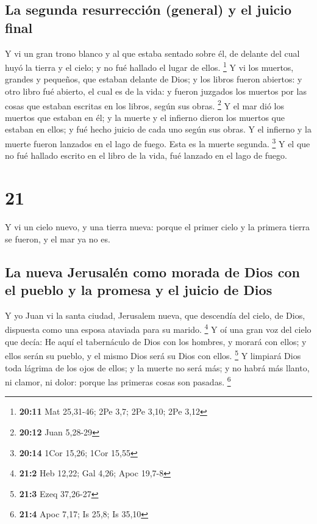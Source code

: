 \hypertarget{la-segunda-resurrecciuxf3n-general-y-el-juicio-final}{%
\subsection{La segunda resurrección (general) y el juicio
final}\label{la-segunda-resurrecciuxf3n-general-y-el-juicio-final}}

 Y vi un gran trono blanco y al que estaba sentado sobre
él, de delante del cual huyó la tierra y el cielo; y no fué hallado el
lugar de ellos. \footnote{\textbf{20:11} Mat 25,31-46; 2Pe 3,7; 2Pe
  3,10; 2Pe 3,12}  Y vi los muertos, grandes y pequeños,
que estaban delante de Dios; y los libros fueron abiertos: y otro libro
fué abierto, el cual es de la vida: y fueron juzgados los muertos por
las cosas que estaban escritas en los libros, según sus obras.
\footnote{\textbf{20:12} Juan 5,28-29}  Y el mar dió los
muertos que estaban en él; y la muerte y el infierno dieron los muertos
que estaban en ellos; y fué hecho juicio de cada uno según sus obras.
 Y el infierno y la muerte fueron lanzados en el lago de
fuego. Esta es la muerte segunda. \footnote{\textbf{20:14} 1Cor 15,26;
  1Cor 15,55}  Y el que no fué hallado escrito en el libro
de la vida, fué lanzado en el lago de fuego.

\hypertarget{section-20}{%
\section{21}\label{section-20}}

 Y vi un cielo nuevo, y una tierra nueva: porque el primer
cielo y la primera tierra se fueron, y el mar ya no es.

\hypertarget{la-nueva-jerusaluxe9n-como-morada-de-dios-con-el-pueblo-y-la-promesa-y-el-juicio-de-dios}{%
\subsection{La nueva Jerusalén como morada de Dios con el pueblo y la
promesa y el juicio de
Dios}\label{la-nueva-jerusaluxe9n-como-morada-de-dios-con-el-pueblo-y-la-promesa-y-el-juicio-de-dios}}

 Y yo Juan vi la santa ciudad, Jerusalem nueva, que
descendía del cielo, de Dios, dispuesta como una esposa ataviada para su
marido. \footnote{\textbf{21:2} Heb 12,22; Gal 4,26; Apoc 19,7-8}
 Y oí una gran voz del cielo que decía: He aquí el
tabernáculo de Dios con los hombres, y morará con ellos; y ellos serán
su pueblo, y el mismo Dios será su Dios con ellos. \footnote{\textbf{21:3}
  Ezeq 37,26-27}  Y limpiará Dios toda lágrima de los ojos
de ellos; y la muerte no será más; y no habrá más llanto, ni clamor, ni
dolor: porque las primeras cosas son pasadas. \footnote{\textbf{21:4}
  Apoc 7,17; Is 25,8; Is 35,10}

